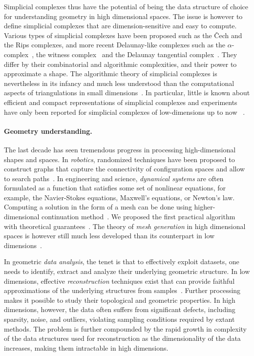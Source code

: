 Simplicial complexes thus have the potential of being the data structure of choice for understanding geometry in high dimensional spaces. The issue is however to define simplicial complexes that are dimension-sensitive and easy to compute.  Various types of simplicial complexes have been proposed such as the \v{C}ech and the Rips complexes, and more recent Delaunay-like complexes such as the $\alpha$-complex~\cite{eks-sspp-83,he-ubds-95}, the witness complex~\cite{deSilva2008,cds-tewc-2004} and the Delaunay tangential complex~\cite{geometrica-7142i}. They differ by their combinatorial and algorithmic complexities, and their power to approximate a shape.  The algorithmic theory of simplicial complexes is nevertheless in its infancy and much less understood than the computational aspects of triangulations in small dimensions~\cite{by-ag-98,he-gtmg-2001}. In particular, little is known about efficient and compact representations of simplicial complexes and experiments have only been reported for simplicial complexes of low-dimensions up to now ~\cite{rg-bptd-2008}.  


\paragraph{Geometry understanding.}

The last decade has seen tremendous progress in processing high-dimensional shapes and spaces. In {\em robotics}, randomized techniques have been proposed to construct graphs that capture the connectivity of configuration spaces and allow to search paths~\cite{sml-pa-2006}. 
In engineering and science, {\em dynamical systems} are often formulated as a function that satisfies some set of nonlinear equations, for example, the Navier-Stokes equations, Maxwell's equations, or Newton's law. Computing a  solution in the form of a mesh can be done using
higher-dimensional continuation method~\cite{mh-mpc-2002}. We proposed the first practical algorithm with theoretical guarantees~\cite{boissonnat2010meshing}. The theory of {\em mesh generation} in high dimensional spaces is however still much less developed than its counterpart in low dimensions~\cite{he-gtmg-2001,geometrica-ecg-book}.  

In geometric {\em data analysis}, the tenet is that to effectively exploit datasets, one needs to identify, extract and analyze their underlying geometric structure.  In low dimensions, effective {\em reconstruction} techniques exist that can provide faithful approximations of the underlying structures from samples~\cite{dey-csr-2007}. Further processing makes it possible to study their topological and geometric properties. In high dimensions, however, the data often suffers from significant defects, including sparsity, noise, and outliers, violating sampling conditions required by extant methods. The problem is further compounded by the rapid growth in complexity of the data structures used for reconstruction as the dimensionality of the data increases, making them intractable in high dimensions. 


